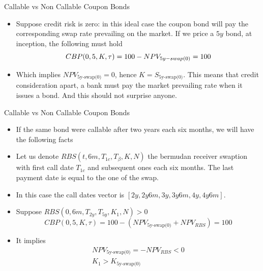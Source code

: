\documentclass{beamer}
\begin{document}
\begin{frame}{Callable vs Non Callable Coupon Bonds}
	\begin{itemize}
		\item Suppose credit risk is zero: in this ideal case the coupon bond will pay the corresponding swap rate prevailing on the market.
		If we price a $5y$ bond, at inception, the following must hold
		\begin{equation*}
			CBP(0,5,K,\tau)=100-NPV_{\text5y-swap(0)}=100
		\end{equation*}
		\item Which implies $NPV_{\text{5y-swap(0)}}=0$, hence $K=S_{\text{5y-swap(0)}}$. This means that credit consideration apart, a bank must pay the market prevailing rate when it issues a bond. And this should not surprise anyone.
	\end{itemize}
\end{frame}

\begin{frame}{Callable vs Non Callable Coupon Bonds}
	\begin{itemize}
		\item If the same bond were callable after two years each six months, we will have the following facts
		\item Let us denote $RBS(t,6m,T_{1c},T_\beta,K,N)$ the bermudan receiver swaption with first call date $T_{1c}$ and subsequent ones each six months. The last payment date is equal to the one of the swap.
		\item In this case the call dates vector is $[2y,2y6m,3y,3y6m,4y,4y6m]$.
		\item Suppose $RBS(0,6m,T_{2y},T_{5y},K_1,N)>0$
		\begin{equation}
			CBP(0,5,K,\tau)=100-(NPV_{\text{5y-swap(0)}}+NPV_{RBS})=100
		\end{equation}
		\item It implies 
		\begin{equation}
			\begin{gathered}
				NPV_{\text{5y-swap(0)}}=-NPV_{RBS}<0 \\
				K_1 > K_{\text{5y-swap(0)}}
			\end{gathered}
		\end{equation}
	\end{itemize}
\end{frame}
\end{document}
